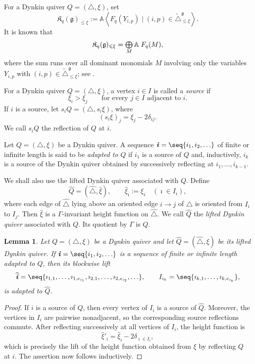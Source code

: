 \documentclass[12pt, leqno]{amsart}
\numberwithin{equation}{section}
\theoremstyle{plain}
\newtheorem{lemma}{Lemma}[section]
\theoremstyle{definition}
\newcommand{\hxi}{{\widehat{\xi}}}
\renewcommand{\le}{\leqslant}
\newcommand{\seteq}{\mathbin{:=}}
\newcommand{\soplus}{\mathop{\mbox{\normalsize$\bigoplus$}}\limits}
\newcommand{\g}{\mathfrak{g}}
\newcommand{\Dynkin}{\triangle}
\newcommand{\im}{\imath}
\newcommand{\ii}{ \textbf{\textit{i}}}
\newcommand{\hQ}{\widehat{Q}}
\newcommand{\hii}{{\widehat{\ii}}}
\newcommand{\frakK}{\mathfrak{K}}
\newcommand{\bbA}{\mathbb{A}}
\newcommand{\hDynkin}{{\widehat{\Dynkin}}}
\newcommand{\tDynkin}{{\widetilde{\Dynkin}}}
\begin{document}
For a Dynkin quiver $Q=(\Dynkin,\xi)$, set
\[
\frakK_q(\g)_{\le\xi} \seteq \bbA\left\langle F_q(Y_{i,p}) \mid (i,p)\in\tDynkin_{\le\xi}^\g \right\rangle.
\]
It is known that
\[
\frakK_q(\g)_{\le\xi} = \soplus_M  \bbA \; F_q(M),
\]
where the sum runs over all dominant monomials $M$ involving only
the variables $Y_{i,p}$ with $(i,p)\in\tDynkin_{\le\xi}^\g$; see
\cite{HL16,B21,FHOO,JLO1}.

For a Dynkin quiver $Q=(\Dynkin,\xi)$, a vertex $i\in I$ is called
a \emph{source} if
\[
\xi_i>\xi_j
\qquad\text{for every }j\in I\text{ adjacent to }i.
\]
If $i$ is a source, let $s_iQ=(\Dynkin,s_i\xi)$, where
\[
(s_i\xi)_j = \xi_j-2\delta_{ij}.
\]
We call $s_iQ$ the reflection of $Q$ at $i$.

Let $Q=(\Dynkin,\xi)$ be a Dynkin quiver.  A sequence
$\ii=\seq{i_1,i_2,\ldots}$
of finite or infinite length is said to be \emph{adapted to $Q$} if
$i_1$ is a source of $Q$ and, inductively, $i_k$ is a source of the
Dynkin quiver obtained by successively reflecting at
$i_1,\ldots,i_{k-1}$.

We shall also use the lifted Dynkin quiver associated with $Q$.
Define
\[
\hQ=(\hDynkin,\hxi), \qquad \hxi_{\im}\seteq\xi_i \quad (\im\in I_i),
\]
where each edge of $\hDynkin$ lying above an oriented edge
$i\to j$ of $\Dynkin$ is oriented from $I_i$ to $I_j$.
Then $\hxi$ is a $\Gamma$-invariant height function on $\hDynkin$.
  We call $\hQ$ the \emph{lifted Dynkin quiver} associated with $Q$.
Its quotient by $\Gamma$ is $Q$.

\begin{lemma}\label{lem: lifting adapted sequences}
Let $Q=(\Dynkin,\xi)$ be a Dynkin quiver and let
$\hQ=(\hDynkin,\hxi)$ be its   lifted Dynkin quiver.
If $\ii=\seq{i_1,i_2,\ldots}$
is a sequence of finite or infinite length adapted to $Q$,  then its
blockwise lift{}
\[
\hii = \seq{\im_{1,1},\ldots,\im_{1,e_{i_1}},  \im_{2,1},\ldots,\im_{2,e_{i_2}},\ldots},
\qquad
I_{i_k} = \seq{\im_{k,1},\ldots,\im_{k,e_{i_k}}},
\]
is adapted to $\hQ$.
\end{lemma}

\begin{proof}
If $i$ is a source of $Q$, then every vertex of $I_i$ is a source
of $\hQ$.  Moreover, the vertices in $I_i$ are pairwise
nonadjacent, so the corresponding source reflections commute.
After reflecting successively at all vertices of $I_i$, the height function is
\[
\hxi'_{\im} = \hxi_{\im}-2\delta_{\im\in I_i},
\]
which is precisely the lift of the height function obtained from
$\xi$ by reflecting $Q$ at $i$.
The assertion now follows inductively.
\end{proof}
\end{document}
